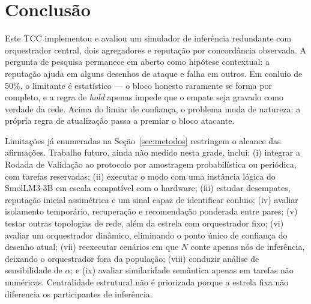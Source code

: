 \documentclass[12pt]{article}
\begin{document}
\section{Conclusão}
\label{sec:conclusao}

Este TCC implementou e avaliou um simulador de inferência redundante com orquestrador central, dois agregadores e reputação por concordância observada. A pergunta de pesquisa permanece em aberto como hipótese contextual: a reputação ajuda em alguns desenhos de ataque e falha em outros. Em conluio de 50\%, o limitante é estatístico --- o bloco honesto raramente se forma por completo, e a regra de \textit{hold} apenas impede que o empate seja gravado como verdade da rede. Acima do limiar de confiança, o problema muda de natureza: a própria regra de atualização passa a premiar o bloco atacante.

Limitações já enumeradas na Seção~\ref{sec:metodos} restringem o alcance das afirmações. Trabalho futuro, ainda não medido nesta grade, inclui: (i) integrar a Rodada de Validação ao protocolo por amostragem probabilística ou periódica, com tarefas reservadas; (ii) executar o modo com uma instância lógica do SmolLM3-3B em escala compatível com o hardware; (iii) estudar desempates, reputação inicial assimétrica e um sinal capaz de identificar conluio; (iv) avaliar isolamento temporário, recuperação e recomendação ponderada entre pares; (v) testar outras topologias de rede, além da estrela com orquestrador fixo; (vi) avaliar um orquestrador dinâmico, eliminando o ponto único de confiança do desenho atual; (vii) reexecutar cenários em que $N$ conte apenas nós de inferência, deixando o orquestrador fora da população; (viii) conduzir análise de sensibilidade de $\alpha$; e (ix) avaliar similaridade semântica apenas em tarefas não numéricas. Centralidade estrutural não é priorizada porque a estrela fixa não diferencia os participantes de inferência.
\end{document}
